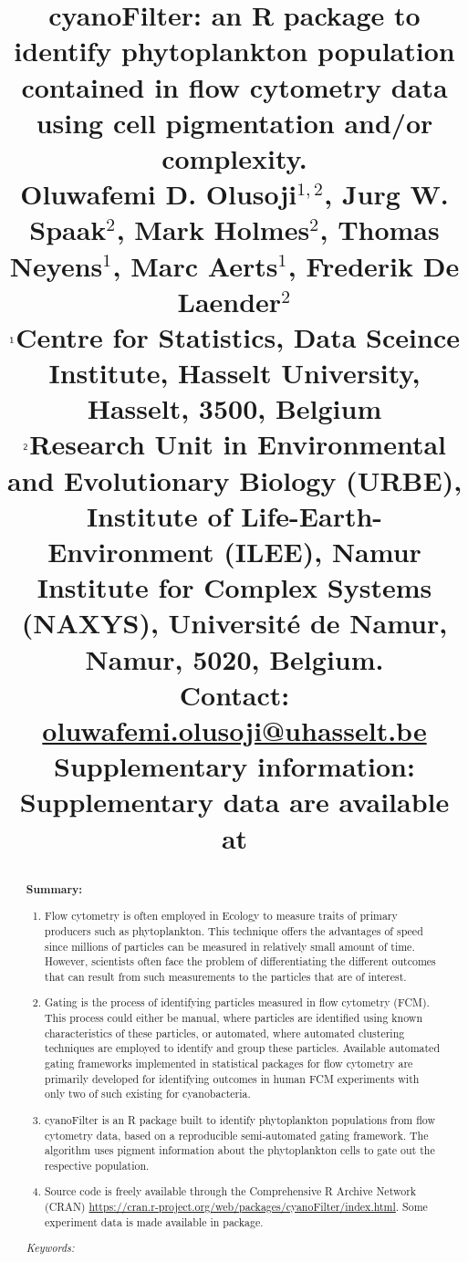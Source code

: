 \documentclass[a4paper,12pt]{extarticle}
\title{
		\begin{flushleft} 
			\Huge{cyanoFilter: an R package to identify phytoplankton population contained in flow cytometry data using cell pigmentation and/or complexity.} \\
			\vspace{0.4in} \small{Oluwafemi D. Olusoji$^{1,2}$, Jurg W. Spaak$^{2}$, Mark Holmes$^{2}$, Thomas Neyens$^{1}$, Marc Aerts$^{1}$, Frederik De Laender$^{2}$} \\\vspace{0.2in}			
			$^{\text{\sf 1}}$Centre for Statistics, Data Sceince Institute, Hasselt University, Hasselt, 3500, Belgium\\
			$^{\text{\sf 2}}$Research Unit in Environmental and Evolutionary Biology (URBE), Institute of Life-Earth-Environment (ILEE), Namur Institute for Complex Systems (NAXYS), Universit\'{e} de Namur, Namur, 5020, Belgium.\\\vspace{0.2in}
			\textbf{Contact:}\\ \href{oluwafemi.olusoji@uhasselt.be}{oluwafemi.olusoji@uhasselt.be}\\
			\textbf{Supplementary information:} Supplementary data are available at \textit{}
		\end{flushleft}
	}
\date{}
\begin{document}
	
	\maketitle
	\newpage
	\linenumbers
	\begin{abstract}
		\textbf{Summary:} 
		\begin{enumerate}
			
			\item Flow cytometry is often employed in Ecology to measure traits of primary producers such as phytoplankton. This technique offers the advantages of speed since millions of particles can be measured in relatively small amount of time. However, scientists often face the problem of differentiating the different outcomes that can result from such measurements to the particles that are of interest.
			
			\item Gating is the process of identifying particles measured in flow cytometry (FCM). This process could either be manual, where particles are identified using known characteristics of these particles, or automated, where automated clustering techniques are employed to identify and group these particles. Available automated gating frameworks implemented in statistical packages for flow cytometry are primarily developed for identifying outcomes in human FCM experiments with only two of such existing for cyanobacteria.
			
			\item cyanoFilter is an R package built to identify phytoplankton populations from flow cytometry data, based on a reproducible semi-automated gating framework. The algorithm uses pigment information about the phytoplankton cells to gate out the respective population.
			
			\item Source code is freely available through the Comprehensive R Archive Network (CRAN) \href{https://cran.r-project.org/web/packages/cyanoFilter/index.html}{https://cran.r-project.org/web/packages/cyanoFilter/index.html}. Some experiment data is made available in package. 
			
		\end{enumerate}

		\noindent \textit{Keywords: }
	\end{abstract}


\title{}
\end{document}
